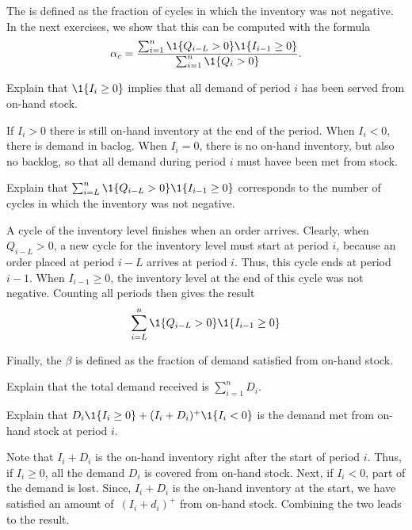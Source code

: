The  is defined as the fraction of cycles in which the inventory was not negative.  In the next exercises, we show that this can be computed with the formula
\begin{equation}
\alpha_c =  \frac{\sum_{i=1}^n \1{Q_{i-L}>0}\1{I_{i-1}\geq 0}}{\sum_{i=1}^n \1{Q_i>0}}.
\end{equation}

\begin{exercise}
Explain that $\1{I_i\geq 0}$ implies that all demand of period $i$ has been served from on-hand stock. 
\begin{solution}
  If $I_i > 0$ there is still on-hand inventory at the end of the period. When $I_i < 0$, there is demand in baclog. When $I_i = 0$, there is no on-hand inventory, but also no backlog, so that all demand during period $i$ must havee been met from stock. 
\end{solution}
\end{exercise}


\begin{exercise}
  Explain that $\sum_{i=L}^n \1{Q_{i-L}>0}\1{\IL_{i-1}\geq0}$ corresponds to the number of cycles in which the inventory was not negative.
  \begin{solution}
A cycle of the inventory level finishes when an order arrives. Clearly, when $Q_{i-L}>0$, a new cycle for the inventory level must start at period $i$, because an order placed at period $i-L$ arrives at period $i$. Thus, this cycle ends at period $i-1$. When $I_{i-1}\geq 0$, the inventory level at the end of this cycle was not negative. 
Counting all periods then gives the result
\begin{equation*}
  \sum_{i=L}^n \1{Q_{i-L} > 0}\1{\IL_{i-1} \geq 0}
\end{equation*}
  \end{solution}
\end{exercise}

Finally, the  $\beta$ is defined as the fraction of demand satisfied from on-hand stock. 

\begin{exercise}
Explain that the total demand received is $\sum_{i=1}^n D_i$. 
\end{exercise}

\begin{exercise}
Explain that $D_i\1{I_i\geq 0} + (I_i+D_i)^+\1{I_i< 0}$ is the demand met from on-hand stock at period $i$.
\begin{solution}
  Note that $I_i+D_i$ is the on-hand inventory right after the start of period $i$. Thus, if $I_i\geq 0$, all the demand $D_i$ is covered from on-hand stock. Next, if $I_i<0$, part of the demand is lost. Since, $I_i+D_i$ is the on-hand inventory at the start, we have satisfied an amount of~$(I_i+d_i)^+$ from on-hand stock. Combining the two leads to the result. 
\end{solution}
\end{exercise}

